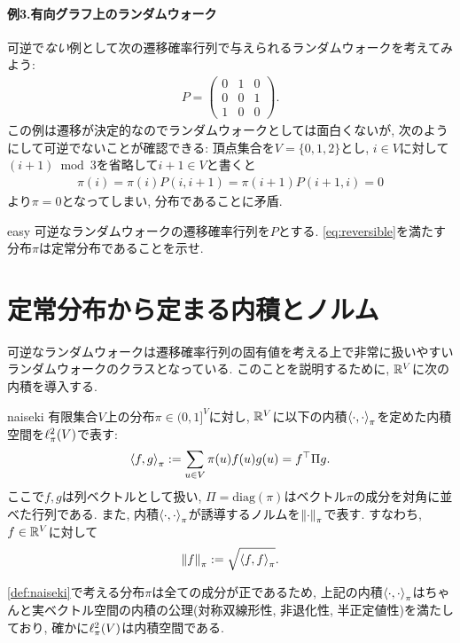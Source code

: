 \paragraph*{例3.有向グラフ上のランダムウォーク}
可逆で\emph{ない}例として次の遷移確率行列で与えられるランダムウォークを考えてみよう:
\begin{align*}
    P = \begin{pmatrix}
            0 & 1 & 0 \\
            0 & 0 & 1 \\
            1 & 0 & 0
        \end{pmatrix}.
\end{align*}
この例は遷移が決定的なのでランダムウォークとしては面白くないが,
次のようにして可逆でないことが確認できる:
頂点集合を$V=\{0,1,2\}$とし, $i\in V$に対して$(i+1)\bmod 3$を省略して$i+1 \in V$と書くと
\begin{align*}
    \pi(i) = \pi(i) P(i, i+1) = \pi(i+1)P(i+1,i) = 0
\end{align*}
より$\pi=0$となってしまい, 分布であることに矛盾.

\begin{exercise}{easy}{}
    可逆なランダムウォークの遷移確率行列を$P$とする.
    \cref{eq:reversible}を満たす分布$\pi$は定常分布であることを示せ.
\end{exercise}

%


\section{定常分布から定まる内積とノルム}
可逆なランダムウォークは遷移確率行列の固有値を考える上で非常に扱いやすいランダムウォークのクラスとなっている.
このことを説明するために, $\mathbb{R}^V$に次の内積を導入する.
\begin{definition}{}{naiseki}
    有限集合$V$上の分布$\pi\in(0,1]^V$に対し,
    $\mathbb{R}^V$に以下の内積$\left\langle\cdot,\cdot\right\rangle_{\pi}$を定めた内積空間を$\ell^2_\pi(V)$で表す:
    \begin{align*}
        \left\langle f,g\right\rangle_{\pi} \mathrel{:=} \sum_{u \in V} \pi(u) f(u) g(u)
        = f^\top \Pi g.
    \end{align*}
    ここで$f,g$は列ベクトルとして扱い, $\Pi=\mathrm{diag}(\pi)$はベクトル$\pi$の成分を対角に並べた行列である.
    また, 内積$\left\langle\cdot,\cdot\right\rangle_{\pi}$が誘導するノルムを$\left\lVert\cdot\right\rVert_{\pi}$で表す.
    すなわち, $f\in\mathbb{R}^V$に対して
    \[
        \left\lVert f\right\rVert_{\pi} \mathrel{:=} \sqrt{\left\langle f,f\right\rangle_{\pi}}.
    \]
\end{definition}
\cref{def:naiseki}で考える分布$\pi$は全ての成分が正であるため,
上記の内積$\left\langle\cdot,\cdot\right\rangle_{\pi}$はちゃんと実ベクトル空間の内積の公理(対称双線形性, 非退化性, 半正定値性)を満たしており,
確かに$\ell^2_\pi(V)$は内積空間である.

